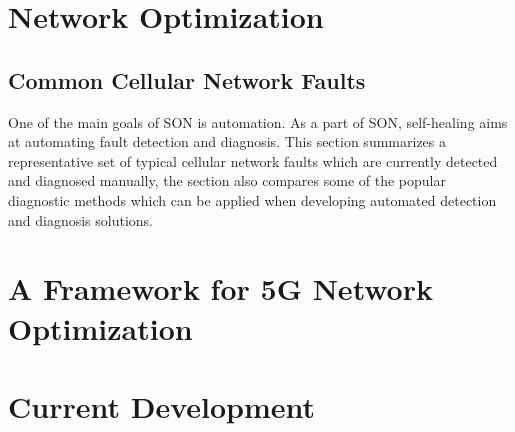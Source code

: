 \documentclass[conference]{IEEEtran}
\begin{document}
\section{Network Optimization}
\label{sec:background}
\subsection{Common Cellular Network Faults}
One of the main goals of SON is automation.  As a part of SON, self-healing aims at automating fault detection and diagnosis.  This section summarizes a representative set of typical cellular network faults which are currently detected and diagnosed manually, the section also compares some of the popular diagnostic methods which can be applied when developing automated detection and diagnosis solutions.

\section{A Framework for 5G Network Optimization}
\section{Current Development}
\end{document}
